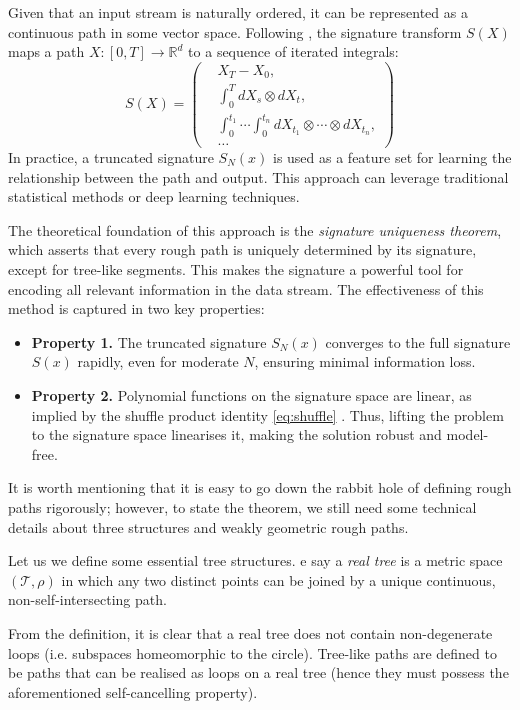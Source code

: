 Given that an input stream is naturally ordered, it can be represented as a continuous path in some vector space. Following \cite{geng2021introduction}, the signature transform \( S(X) \) maps a path \( X: [0, T] \to \mathbb{R}^d \) to a sequence of  iterated integrals:
\[
  S(X) = \left(  \begin{split}
 & X_{T} - X_{0},    \\
   &   \int_0^T \! dX_s \otimes dX_t, \\
 & \int_0^{t_1} \cdots \int_0^{t_n} dX_{t_1} \otimes \cdots \otimes dX_{t_n}, \\
  & \dots
    \end{split}\right)
\]
In practice, a truncated signature \( S_N(x) \) is used as a feature set for learning the relationship between the path and output. This approach can leverage traditional statistical methods or deep learning techniques.

The theoretical foundation of this approach is the \textit{signature uniqueness theorem}, which asserts that every rough path is uniquely determined by its signature, except for tree-like segments. This makes the signature a powerful tool for encoding all relevant information in the data stream. The effectiveness of this method is captured in two key properties:

\begin{itemize}
    \item \textbf{Property 1.} The truncated signature \( S_N(x) \) converges to the full signature \( S(x) \) rapidly, even for moderate \( N \), ensuring minimal information loss.

    \item \textbf{Property 2.} Polynomial functions on the signature space are linear, as implied by the shuffle product identity \eqref{eq:shuffle} . Thus, lifting the problem to the signature space linearises it, making the solution robust and model-free.
\end{itemize}


It is worth mentioning that it is easy to go down the rabbit hole of defining rough paths rigorously; however, to state the theorem, we still need some technical details about three structures and weakly geometric rough paths.

Let us we define some essential tree structures.
e say a \textit{real tree} is a metric space $(\mathcal{T}, \rho)$ in which any two distinct points can be joined by a unique continuous, non-self-intersecting path.

From the definition, it is clear that a real tree does not contain non-degenerate loops (i.e. subspaces homeomorphic to the circle). Tree-like paths are defined to be paths that can be realised as loops on a real tree (hence they must possess the aforementioned self-cancelling property).


